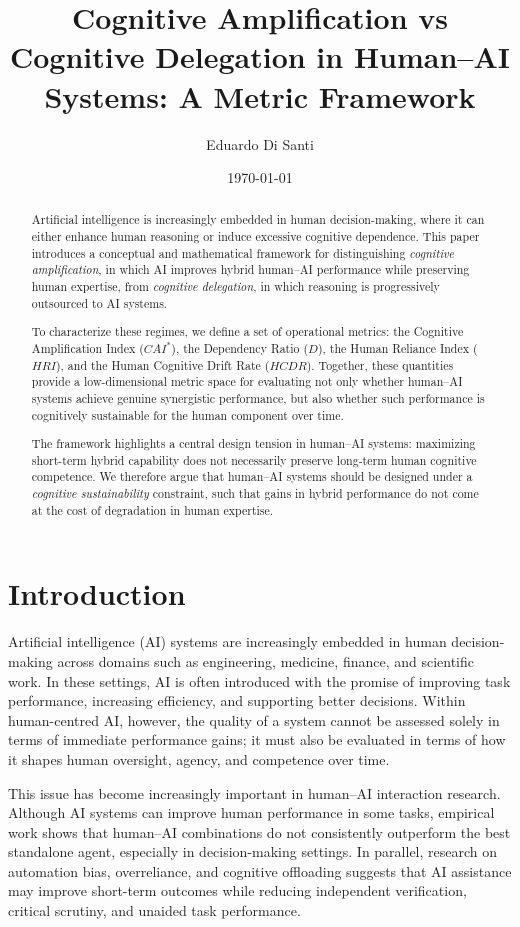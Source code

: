 \documentclass[11pt]{article}
\title{Cognitive Amplification vs Cognitive Delegation in Human--AI Systems:
A Metric Framework}
\author{
Eduardo Di Santi\\[4pt]
}
\date{\today}
\begin{document}
\maketitle

\begin{abstract}
Artificial intelligence is increasingly embedded in human decision-making,
where it can either enhance human reasoning or induce excessive cognitive
dependence. This paper introduces a conceptual and mathematical framework
for distinguishing \emph{cognitive amplification}, in which AI improves
hybrid human--AI performance while preserving human expertise, from
\emph{cognitive delegation}, in which reasoning is progressively outsourced
to AI systems.

To characterize these regimes, we define a set of operational metrics:
the Cognitive Amplification Index ($CAI^*$), the Dependency Ratio ($D$),
the Human Reliance Index ($HRI$), and the Human Cognitive Drift Rate ($HCDR$).
Together, these quantities provide a low-dimensional metric space for
evaluating not only whether human--AI systems achieve genuine synergistic
performance, but also whether such performance is cognitively sustainable
for the human component over time.

The framework highlights a central design tension in human--AI systems:
maximizing short-term hybrid capability does not necessarily preserve
long-term human cognitive competence. We therefore argue that human--AI
systems should be designed under a \emph{cognitive sustainability}
constraint, such that gains in hybrid performance do not come at the cost
of degradation in human expertise.
\end{abstract}

\section{Introduction}

Artificial intelligence (AI) systems are increasingly embedded in
human decision-making across domains such as engineering, medicine,
finance, and scientific work. In these settings, AI is often introduced
with the promise of improving task performance, increasing efficiency,
and supporting better decisions. Within human-centred AI, however,
the quality of a system cannot be assessed solely in terms of immediate
performance gains; it must also be evaluated in terms of how it shapes
human oversight, agency, and competence over time.

This issue has become increasingly important in human--AI interaction
research. Although AI systems can improve human performance in some
tasks, empirical work shows that human--AI combinations do not
consistently outperform the best standalone agent, especially in
decision-making settings. In parallel, research on automation bias,
overreliance, and cognitive offloading suggests that AI assistance may
improve short-term outcomes while reducing independent verification,
critical scrutiny, and unaided task performance.
\end{document}
